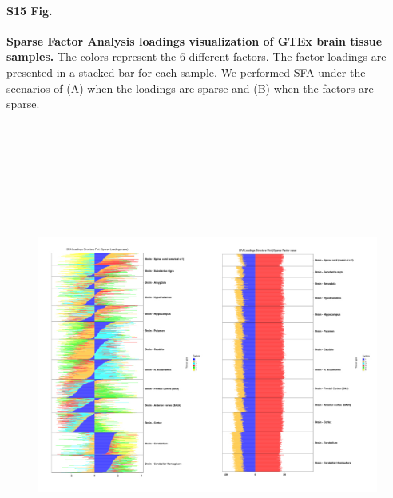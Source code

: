 \documentclass[10pt,letterpaper]{article}
\begin{document}
\paragraph*{S15 Fig.}

\label{figS15}
{\bf Sparse Factor Analysis loadings visualization of GTEx brain tissue samples.} The colors represent the 6 different factors. The factor loadings are presented in a stacked bar for each sample. We performed SFA under the scenarios of (A) when the loadings are sparse and (B) when the factors are sparse.

\begin{figure}[ht]
\centering
\includegraphics[height=6.3in, width=7in]{../../plots/gtex-figures/gtex_sfa_brain.jpeg}
\end{figure}
\end{document}
